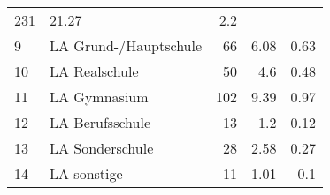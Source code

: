 \begin{longtable}{lXrrr}
       \num{231} &
       \num[round-mode=places,round-precision=2]{21,27} &
         \num[round-mode=places,round-precision=2]{2,2} \\

     9 &
     \multicolumn{1}{X}{ LA Grund-/Hauptschule   } &


       \num{66} &
       \num[round-mode=places,round-precision=2]{6,08} &
         \num[round-mode=places,round-precision=2]{0,63} \\

     10 &
     \multicolumn{1}{X}{ LA Realschule   } &


       \num{50} &
       \num[round-mode=places,round-precision=2]{4,6} &
         \num[round-mode=places,round-precision=2]{0,48} \\

     11 &
     \multicolumn{1}{X}{ LA Gymnasium   } &


       \num{102} &
       \num[round-mode=places,round-precision=2]{9,39} &
         \num[round-mode=places,round-precision=2]{0,97} \\

     12 &
     \multicolumn{1}{X}{ LA Berufsschule   } &


       \num{13} &
       \num[round-mode=places,round-precision=2]{1,2} &
         \num[round-mode=places,round-precision=2]{0,12} \\

     13 &
     \multicolumn{1}{X}{ LA Sonderschule   } &


       \num{28} &
       \num[round-mode=places,round-precision=2]{2,58} &
         \num[round-mode=places,round-precision=2]{0,27} \\

     14 &
     \multicolumn{1}{X}{ LA sonstige   } &


       \num{11} &
       \num[round-mode=places,round-precision=2]{1,01} &
         \num[round-mode=places,round-precision=2]{0,1} \\


\end{longtable}
